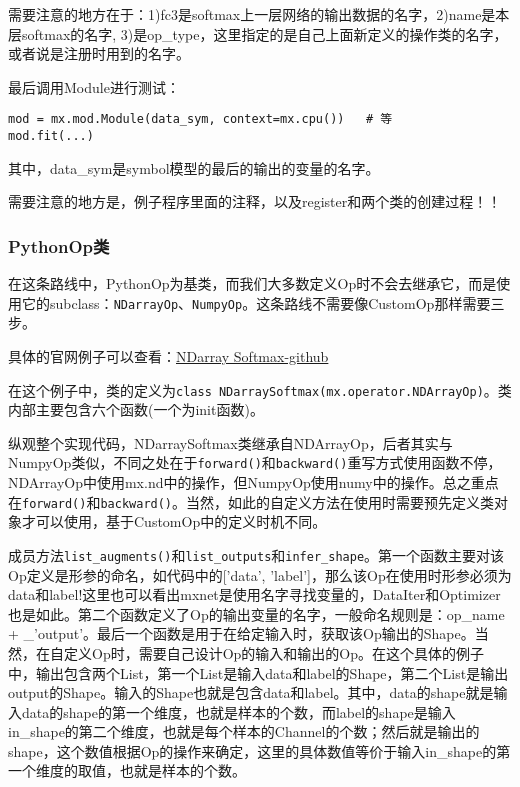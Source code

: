需要注意的地方在于：1)fc3是softmax上一层网络的输出数据的名字，2)name是本层softmax的名字, 3)是op\_type，这里指定的是自己上面新定义的操作类的名字，或者说是注册时用到的名字。

最后调用Module进行测试：
\begin{lstlisting}
mod = mx.mod.Module(data_sym, context=mx.cpu())   # 等
mod.fit(...)
\end{lstlisting}

其中，data\_sym是symbol模型的最后的输出的变量的名字。

需要注意的地方是，例子程序里面的注释，以及register和两个类的创建过程！！

\subsubsection{PythonOp类}

在这条路线中，PythonOp为基类，而我们大多数定义Op时不会去继承它，而是使用它的subclass：\verb|NDarrayOp|、\verb|NumpyOp|。这条路线不需要像CustomOp那样需要三步。

具体的官网例子可以查看：\href{https://github.com/ROCmSoftwarePlatform/mxnet/blob/master/example/numpy-ops/ndarray_softmax.py}{NDarray Softmax-github}

在这个例子中，类的定义为\verb|class NDarraySoftmax(mx.operator.NDArrayOp)|。类内部主要包含六个函数(一个为init函数)。

纵观整个实现代码，NDarraySoftmax类继承自NDArrayOp，后者其实与NumpyOp类似，不同之处在于\verb|forward()|和\verb|backward()|重写方式使用函数不停，NDArrayOp中使用mx.nd中的操作，但NumpyOp使用numy中的操作。总之重点在\verb|forward()|和\verb|backward()|。当然，如此的自定义方法在使用时需要预先定义类对象才可以使用，基于CustomOp中的定义时机不同。

成员方法\verb|list_augments()|和\verb|list_outputs|和\verb|infer_shape|。第一个函数主要对该Op定义是形参的命名，如代码中的['data', 'label']，那么该Op在使用时形参必须为data和label!这里也可以看出mxnet是使用名字寻找变量的，DataIter和Optimizer也是如此。第二个函数定义了Op的输出变量的名字，一般命名规则是：op\_name + \_'output'。最后一个函数是用于在给定输入时，获取该Op输出的Shape。当然，在自定义Op时，需要自己设计Op的输入和输出的Op。在这个具体的例子中，输出包含两个List，第一个List是输入data和label的Shape，第二个List是输出output的Shape。输入的Shape也就是包含data和label。其中，data的shape就是输入data的shape的第一个维度，也就是样本的个数，而label的shape是输入in\_shape的第二个维度，也就是每个样本的Channel的个数；然后就是输出的shape，这个数值根据Op的操作来确定，这里的具体数值等价于输入in\_shape的第一个维度的取值，也就是样本的个数。

